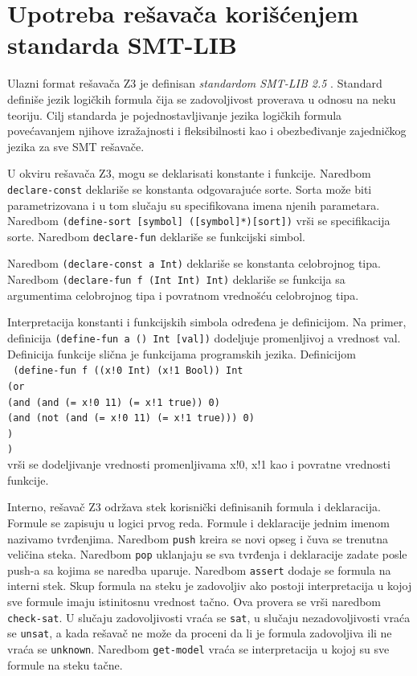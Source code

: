 \documentclass[12pt,oneside]{memoir}
\newcommand\tab[1][0.5cm]{\hspace*{#1}}
\begin{document}
\section{Upotreba rešavača korišćenjem standarda SMT-LIB} \label{sec:num4}
Ulazni format rešavača Z3 je definisan \emph{standardom SMT-LIB 2.5} \cite{SMTLIB}. Standard definiše jezik logičkih formula čija se zadovoljivost proverava u odnosu na neku teoriju. Cilj standarda je pojednostavljivanje jezika logičkih formula povećavanjem njihove izražajnosti i fleksibilnosti kao i obezbeđivanje zajedničkog jezika za sve SMT rešavače. 
\par
U okviru rešavača Z3, mogu se deklarisati konstante i funkcije. Naredbom \texttt{declare-const} deklariše se konstanta odgovarajuće sorte. Sorta može biti parametrizovana i u tom slučaju su specifikovana imena njenih parametara. Naredbom \texttt{(define-sort [symbol] ([symbol]*)[sort])} vrši se specifikacija sorte.
Naredbom \texttt{declare-fun} deklariše se funkcijski simbol. 
\par
Naredbom \texttt{(declare-const a Int)} deklariše se konstanta celobrojnog tipa. Naredbom \texttt{(declare-fun f (Int Int) Int)} deklariše se funkcija sa argumentima celobrojnog tipa i povratnom vrednošću celobrojnog tipa.
\par
Interpretacija konstanti i funkcijskih simbola određena je definicijom. Na primer, definicija \texttt{(define-fun a () Int [val])} dodeljuje promenljivoj a vrednost val. Definicija funkcije slična je funkcijama programskih jezika. Definicijom \\ \texttt{
(define-fun f ((x!0 Int) (x!1 Bool)) Int
	\\ \tab (or  
	\\ \tab \tab (and (and (= x!0 11) (= x!1 true)) 0)  
	\\ \tab \tab (and (not (and (= x!0 11) (= x!1 true))) 0)
\\ \tab)
\\)} \\vrši se dodeljivanje vrednosti promenljivama x!0, x!1 kao i povratne vrednosti funkcije.  
\par
Interno, rešavač Z3 održava stek korisnički definisanih formula i deklaracija. Formule se zapisuju u logici prvog reda. Formule i deklaracije jednim imenom nazivamo tvrđenjima. Naredbom \texttt{push} kreira se novi opseg i čuva se trenutna veličina steka. Naredbom \texttt{pop} uklanjaju se sva tvrđenja i deklaracije zadate posle push-a sa kojima se naredba uparuje. Naredbom \texttt{assert} dodaje se formula na interni stek. Skup formula na steku je zadovoljiv ako postoji interpretacija u kojoj sve formule imaju istinitosnu vrednost tačno. Ova provera se vrši naredbom \texttt{check-sat}. U slučaju zadovoljivosti vraća se \texttt{sat}, u slučaju nezadovoljivosti vraća se \texttt{unsat}, a kada rešavač ne može da proceni da li je formula zadovoljiva ili ne vraća se \texttt{unknown}. Naredbom \texttt{get-model} vraća se interpretacija u kojoj su sve formule na steku tačne. 
\par
\end{document}
